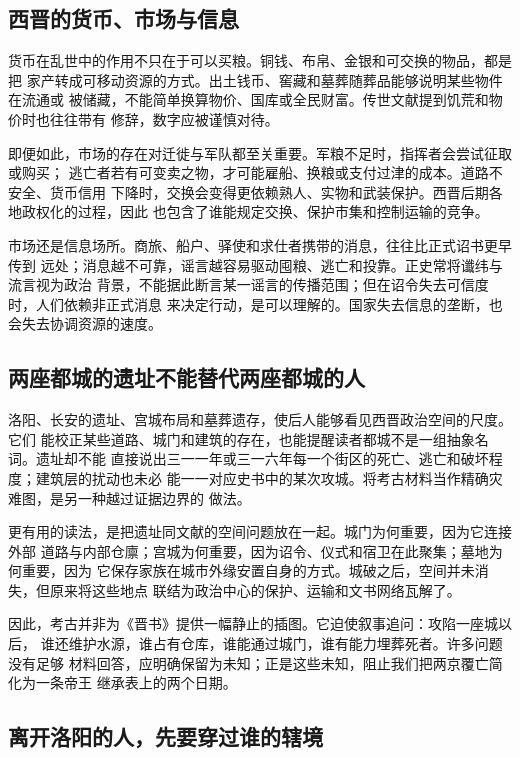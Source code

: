 \subsection{西晋的货币、市场与信息}

货币在乱世中的作用不只在于可以买粮。铜钱、布帛、金银和可交换的物品，都是把
家产转成可移动资源的方式。出土钱币、窖藏和墓葬随葬品能够说明某些物件在流通或
被储藏，不能简单换算物价、国库或全民财富。传世文献提到饥荒和物价时也往往带有
修辞，数字应被谨慎对待。

即便如此，市场的存在对迁徙与军队都至关重要。军粮不足时，指挥者会尝试征取或购买；
逃亡者若有可变卖之物，才可能雇船、换粮或支付过津的成本。道路不安全、货币信用
下降时，交换会变得更依赖熟人、实物和武装保护。西晋后期各地政权化的过程，因此
也包含了谁能规定交换、保护市集和控制运输的竞争。

市场还是信息场所。商旅、船户、驿使和求仕者携带的消息，往往比正式诏书更早传到
远处；消息越不可靠，谣言越容易驱动囤粮、逃亡和投靠。正史常将谶纬与流言视为政治
背景，不能据此断言某一谣言的传播范围；但在诏令失去可信度时，人们依赖非正式消息
来决定行动，是可以理解的。国家失去信息的垄断，也会失去协调资源的速度。

\subsection{两座都城的遗址不能替代两座都城的人}

洛阳、长安的遗址、宫城布局和墓葬遗存，使后人能够看见西晋政治空间的尺度。它们
能校正某些道路、城门和建筑的存在，也能提醒读者都城不是一组抽象名词。遗址却不能
直接说出三一一年或三一六年每一个街区的死亡、逃亡和破坏程度；建筑层的扰动也未必
能一一对应史书中的某次攻城。将考古材料当作精确灾难图，是另一种越过证据边界的
做法。

更有用的读法，是把遗址同文献的空间问题放在一起。城门为何重要，因为它连接外部
道路与内部仓廪；宫城为何重要，因为诏令、仪式和宿卫在此聚集；墓地为何重要，因为
它保存家族在城市外缘安置自身的方式。城破之后，空间并未消失，但原来将这些地点
联结为政治中心的保护、运输和文书网络瓦解了。

因此，考古并非为《晋书》提供一幅静止的插图。它迫使叙事追问：攻陷一座城以后，
谁还维护水源，谁占有仓库，谁能通过城门，谁有能力埋葬死者。许多问题没有足够
材料回答，应明确保留为未知；正是这些未知，阻止我们把两京覆亡简化为一条帝王
继承表上的两个日期。

\subsection{离开洛阳的人，先要穿过谁的辖境}

